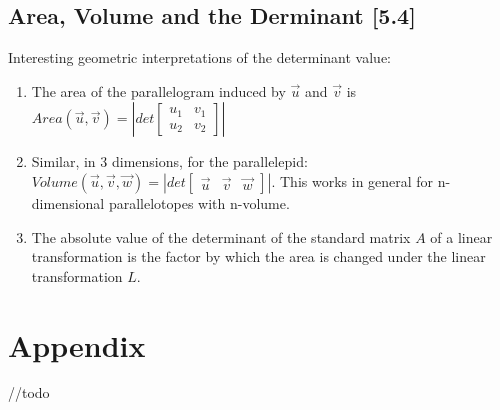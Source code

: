 \documentclass[a4paper,9pt]{extarticle}
\begin{document}
\begin{multicols*}{2}

\subsection{Area, Volume and the Derminant [5.4]}
Interesting geometric interpretations of the determinant value:

\begin{enumerate}[label=\bfseries (\arabic*)] \itemsep0pt \parskip0pt 
    \item The area of the parallelogram induced by $\vec{u}$ and $\vec{v}$ is $Area(\vec{u}, \vec{v}) = |det \begin{bmatrix}u_1 & v_1 \\ u_2 & v_2 \end{bmatrix}|$
    \item Similar, in 3 dimensions, for the parallelepid: $Volume(\vec{u}, \vec{v}, \vec{w}) = |det \begin{bmatrix}\vec{u} & \vec{v} & \vec{w}\end{bmatrix}|$. This works in general for n-dimensional parallelotopes with n-volume.
    \item The absolute value of the determinant of the standard matrix $A$ of a linear transformation is the factor by which the area is changed under the linear transformation $L$.
\end{enumerate}


\section{Appendix}
//todo

\end{multicols*}
\end{document}
